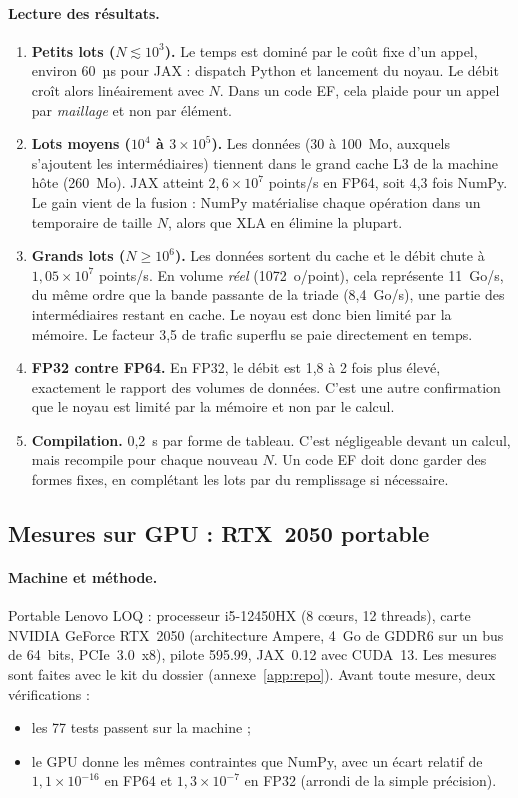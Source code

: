 \paragraph{Lecture des résultats.}
\begin{enumerate}
  \item \textbf{Petits lots ($N\lesssim10^3$).} Le temps est dominé par le coût fixe d'un appel, environ 60~µs pour JAX : dispatch Python et lancement du noyau. Le débit croît alors linéairement avec $N$. Dans un code EF, cela plaide pour un appel par \emph{maillage} et non par élément.
  \item \textbf{Lots moyens ($10^4$ à $3\times10^5$).} Les données (30 à 100~Mo, auxquels s'ajoutent les intermédiaires) tiennent dans le grand cache L3 de la machine hôte (260~Mo). JAX atteint $2{,}6\times10^7$ points/s en FP64, soit 4,3 fois NumPy. Le gain vient de la fusion : NumPy matérialise chaque opération dans un temporaire de taille $N$, alors que XLA en élimine la plupart.
  \item \textbf{Grands lots ($N\ge10^6$).} Les données sortent du cache et le débit chute à $1{,}05\times10^7$ points/s. En volume \emph{réel} (1072~o/point), cela représente 11~Go/s, du même ordre que la bande passante de la triade (8,4~Go/s), une partie des intermédiaires restant en cache. Le noyau est donc bien limité par la mémoire. Le facteur 3,5 de trafic superflu se paie directement en temps.
  \item \textbf{FP32 contre FP64.} En FP32, le débit est 1,8 à 2 fois plus élevé, exactement le rapport des volumes de données. C'est une autre confirmation que le noyau est limité par la mémoire et non par le calcul.
  \item \textbf{Compilation.} 0,2~s par forme de tableau. C'est négligeable devant un calcul, mais  recompile pour chaque nouveau $N$. Un code EF doit donc garder des formes fixes, en complétant les lots par du remplissage si nécessaire.
\end{enumerate}

\subsection{Mesures sur GPU : RTX~2050 portable}\label{sec:gpu}

\paragraph{Machine et méthode.} Portable Lenovo LOQ : processeur i5-12450HX (8 cœurs, 12 threads), carte NVIDIA GeForce RTX~2050 (architecture Ampere, 4~Go de GDDR6 sur un bus de 64~bits, PCIe~3.0~x8), pilote 595.99, JAX~0.12 avec CUDA~13. Les mesures sont faites avec le kit du dossier  (annexe~\ref{app:repo}). Avant toute mesure, deux vérifications :
\begin{itemize}[nosep]
  \item les 77 tests passent sur la machine ;
  \item le GPU donne les mêmes contraintes que NumPy, avec un écart relatif de $1{,}1\times10^{-16}$ en FP64 et $1{,}3\times10^{-7}$ en FP32 (arrondi de la simple précision).
\end{itemize}

